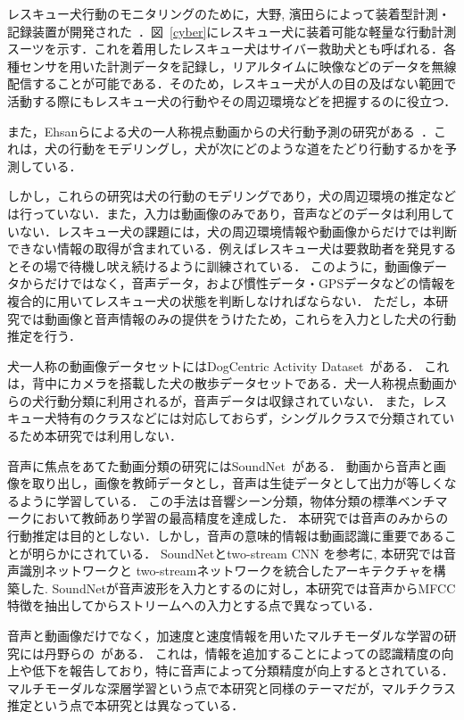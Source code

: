 \documentclass[MIRU,submit]{miru2019j}
\begin{document}
レスキュー犬行動のモニタリングのために，大野, 濱田らによって装着型計測・記録装置が開発された~\cite{dog01}．図~\ref{cyber}にレスキュー犬に装着可能な軽量な行動計測スーツを示す．これを着用したレスキュー犬はサイバー救助犬とも呼ばれる．各種センサを用いた計測データを記録し，リアルタイムに映像などのデータを無線配信することが可能である．そのため，レスキュー犬が人の目の及ばない範囲で活動する際にもレスキュー犬の行動やその周辺環境などを把握するのに役立つ．

また，Ehsanらによる犬の一人称視点動画からの犬行動予測の研究がある~\cite{whoretthedog}．これは，犬の行動をモデリングし，犬が次にどのような道をたどり行動するかを予測している．

しかし，これらの研究は犬の行動のモデリングであり，犬の周辺環境の推定などは行っていない．また，入力は動画像のみであり，音声などのデータは利用していない．レスキュー犬の課題には，犬の周辺環境情報や動画像からだけでは判断できない情報の取得が含まれている．例えばレスキュー犬は要救助者を発見するとその場で待機し吠え続けるように訓練されている．
このように，動画像データからだけではなく，音声データ，および慣性データ・GPSデータなどの情報を複合的に用いてレスキュー犬の状態を判断しなければならない．
ただし，本研究では動画像と音声情報のみの提供をうけたため，これらを入力とした犬の行動推定を行う．

犬一人称の動画像データセットにはDogCentric Activity Dataset~\cite{yumi2014first}がある．
これは，背中にカメラを搭載した犬の散歩データセットである．犬一人称視点動画からの犬行動分類に利用されるが，音声データは収録されていない．
また，レスキュー犬特有のクラスなどには対応しておらず，シングルクラスで分類されているため本研究では利用しない．

音声に焦点をあてた動画分類の研究にはSoundNet~\cite{aytar2016soundnet}がある．
動画から音声と画像を取り出し，画像を教師データとし，音声は生徒データとして出力が等しくなるように学習している．
この手法は音響シーン分類，物体分類の標準ベンチマークにおいて教師あり学習の最高精度を達成した．
本研究では音声のみからの行動推定は目的としない．しかし，音声の意味的情報は動画認識に重要であることが明らかにされている．
SoundNetとtwo-stream CNN を参考に, 本研究では音声識別ネットワークと two-streamネットワークを統合したアーキテクチャを構築した.
SoundNetが音声波形を入力とするのに対し，本研究では音声からMFCC特徴を抽出してからストリームへの入力とする点で異なっている．

音声と動画像だけでなく，加速度と速度情報を用いたマルチモーダルな学習の研究には丹野らの~\cite{tanno2019deim}がある．
これは，情報を追加することによっての認識精度の向上や低下を報告しており，特に音声によって分類精度が向上するとされている．
マルチモーダルな深層学習という点で本研究と同様のテーマだが，マルチクラス推定という点で本研究とは異なっている．
\end{document}
